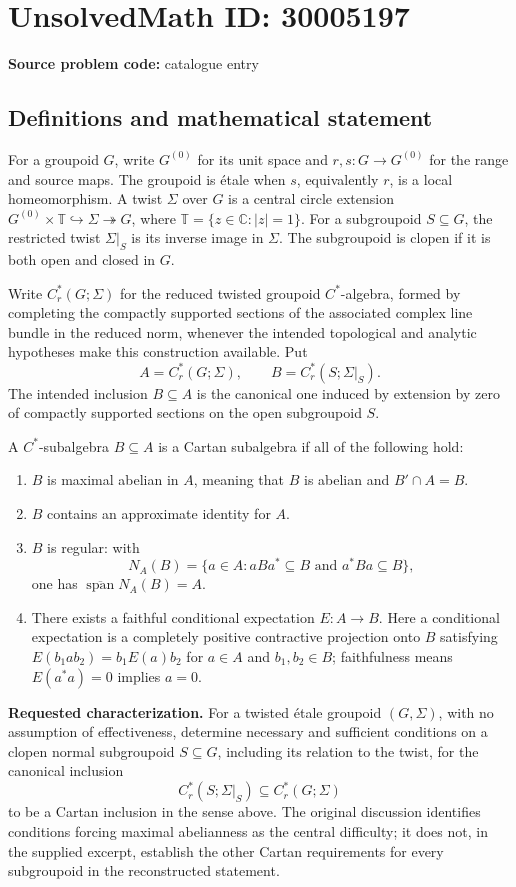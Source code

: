\documentclass[11pt]{article}
\newcommand{\C}{\mathbb{C}}
\begin{document}
\section*{UnsolvedMath ID: 30005197}
\textbf{Source problem code:} catalogue entry
\subsection{Definitions and mathematical statement}
For a groupoid \(G\), write \(G^{(0)}\) for its unit space and \(r,s:G\to G^{(0)}\) for the range and source maps. The groupoid is étale when \(s\), equivalently \(r\), is a local homeomorphism. A twist \(\Sigma\) over \(G\) is a central circle extension \(G^{(0)}\times\mathbb T\hookrightarrow\Sigma\twoheadrightarrow G\), where \(\mathbb T=\{z\in\C:|z|=1\}\). For a subgroupoid \(S\subseteq G\), the restricted twist \(\Sigma|_S\) is its inverse image in \(\Sigma\). The subgroupoid is clopen if it is both open and closed in \(G\).

Write \(C_r^*(G;\Sigma)\) for the reduced twisted groupoid \(C^*\)-algebra, formed by completing the compactly supported sections of the associated complex line bundle in the reduced norm, whenever the intended topological and analytic hypotheses make this construction available. Put
\[
 A=C_r^*(G;\Sigma),\qquad B=C_r^*(S;\Sigma|_S).
\]
The intended inclusion \(B\subseteq A\) is the canonical one induced by extension by zero of compactly supported sections on the open subgroupoid \(S\).

A \(C^*\)-subalgebra \(B\subseteq A\) is a Cartan subalgebra if all of the following hold:
\begin{enumerate}
\item \(B\) is maximal abelian in \(A\), meaning that \(B\) is abelian and \(B'\cap A=B\).
\item \(B\) contains an approximate identity for \(A\).
\item \(B\) is regular: with
\[
 N_A(B)=\{a\in A:aBa^*\subseteq B\text{ and }a^*Ba\subseteq B\},
\]
one has \(\overline{\operatorname{span}}N_A(B)=A\).
\item There exists a faithful conditional expectation \(E:A\to B\). Here a conditional expectation is a completely positive contractive projection onto \(B\) satisfying \(E(b_1ab_2)=b_1E(a)b_2\) for \(a\in A\) and \(b_1,b_2\in B\); faithfulness means \(E(a^*a)=0\) implies \(a=0\).
\end{enumerate}

\textbf{Requested characterization.} For a twisted étale groupoid \((G,\Sigma)\), with no assumption of effectiveness, determine necessary and sufficient conditions on a clopen normal subgroupoid \(S\subseteq G\), including its relation to the twist, for the canonical inclusion
\[
 C_r^*(S;\Sigma|_S)\subseteq C_r^*(G;\Sigma)
\]
to be a Cartan inclusion in the sense above. The original discussion identifies conditions forcing maximal abelianness as the central difficulty; it does not, in the supplied excerpt, establish the other Cartan requirements for every subgroupoid in the reconstructed statement.
\end{document}
